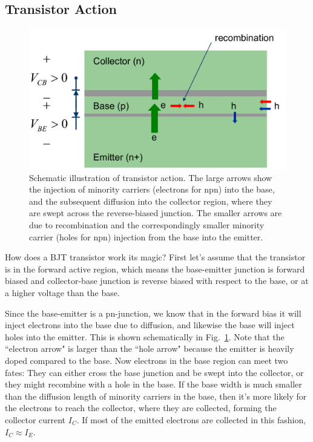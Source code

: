\subsection{Transistor Action}
\begin{figure}[tb]
\begin{center}
\includegraphics[width=.65\columnwidth]{slide9_bjt_action}
\end{center}
\caption{Schematic illustration of transistor action.  The large arrows show the injection of minority carriers (electrons for npn) into the base, and the subsequent diffusion into the collector region, where they are swept across the reverse-biased junction.  The smaller arrows are due to recombination and the correspondingly smaller minority carrier (holes for npn) injection from the base into the emitter.}
\label{fig:slide9_bjt_action}
\end{figure}

How does a BJT transistor work its magic?   First let's assume that the transistor is in the forward active region, which means the base-emitter junction is forward biased and collector-base junction is reverse biased with respect to the base, or at a higher voltage than the base.  

Since the base-emitter is a pn-junction, we know that in the forward bias it will inject electrons into the base due to diffusion, and likewise the base will inject holes into the emitter.  This is shown schematically in Fig.~\ref{fig:slide9_bjt_action}.  Note that the ``electron arrow" is larger than the ``hole arrow" because the emitter is heavily doped compared to the base.  Now electrons in the base region can meet two fates:  They can either cross the base junction and be swept into the collector, or they might recombine with a hole in the base.  If the base width is much smaller than the diffusion length of minority carriers in the base, then it's more likely for the electrons to reach the collector, where they are collected, forming the collector current $I_C$.  If most of the emitted electrons are collected in this fashion, $I_C \approx I_E$.  

